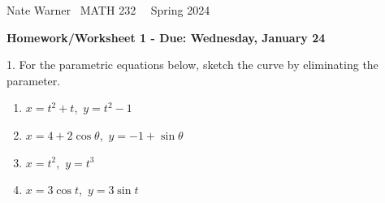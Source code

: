 \documentclass{report}
\title{\Huge{}}
\author{\huge{Nathan Warner}}
\date{\huge{}}
\begin{document}
    \pagebreak \bigbreak \noindent
    Nate Warner \ \quad \quad \quad \quad \quad \quad \quad \quad \quad \quad \quad \quad  MATH 232 \quad  \quad \quad \quad \quad \quad \quad \quad \quad \ \ \quad \quad Spring 2024
    \begin{center}
        \textbf{Homework/Worksheet 1 - Due: Wednesday, January 24}
    \end{center}
    \bigbreak \noindent 
    \begin{mdframed}
        1. For the parametric equations below, sketch the curve by eliminating the parameter.
        \begin{enumerate}[label=(\alph*)]
            \item $x=t^{2} + t$,\ $y=t^{2}-1 $ 
            \item $x=4+2\cos{\theta}$,\ $y=-1+\sin{\theta } $
            \item $x=t^{2}$,\ $y=t^{3} $
            \item $x=3\cos{t}$,\ $y=3\sin{t}$
        \end{enumerate}
    \end{mdframed}
\end{document}
